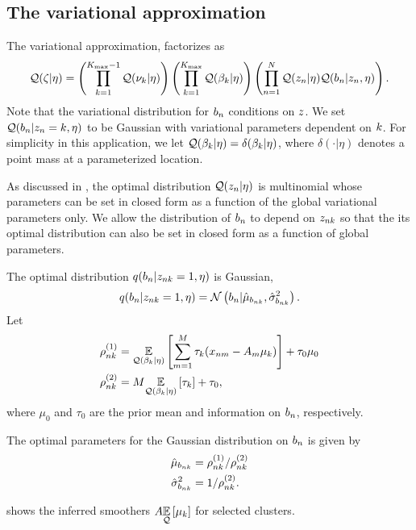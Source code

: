 \subsection{The variational approximation}
The variational approximation, factorizes as
\begin{align*}
\mathcal{Q}(\zeta \vert \eta) =
    \left( \prod_{k=1}^{{K_{\mathrm{max}}} - 1} \mathcal{Q}(\nu_{k} \vert \eta) \right)
    \left( \prod_{k=1}^{{K_{\mathrm{max}}}} \mathcal{Q}(\beta_k \vert \eta) \right)
    \left( \prod_{n=1}^{N} \mathcal{Q}(z_{n} \vert \eta)
    \mathcal{Q}(b_{n} \vert z_{n}, \eta)\right).
\end{align*}
Note that the variational distribution for $b_n$ conditions on $z$.
We set $\mathcal{Q}(b_{n} \vert z_{n} = k, \eta)$ to be Gaussian
with variational parameters dependent on $k$.
For simplicity in this application,
we let $\mathcal{Q}(\beta_k \vert \eta) = \delta (\beta_k \vert \eta)$,
where $\delta(\cdot \vert \eta)$ denotes a point mass at a parameterized location.

As discussed in ,
the optimal distribution $\mathcal{Q}(z_n\vert\eta)$ is multinomial whose parameters
can be set in closed form as a function of the global variational parameters only.
We allow the distribution of $b_n$ to depend on $z_{nk}$ so that
the its optimal distribution can also be set in closed form as a function of
global parameters.

The optimal distribution $q(b_n\vert z_{nk} = 1, \eta)$ is Gaussian,
\begin{align*}
q(b_n\vert z_{nk} = 1, \eta) = \mathcal{N}\left(b_n \vert \hat\mu_{b_{nk}}, \hat\sigma^2_{b_{nk}}\right).
\end{align*}
Let
\begin{align*}
  \rho^{(1)}_{nk} &= \underset{\mathcal{Q}(\beta_k|\eta)}{\mathbb{E}}\left[\sum_{m=1}^M \tau_{k}(x_{nm} - A_m\mu_k)\right] +
  \tau_0 \mu_0 \\
  \rho^{(2)}_{nk} &= M \underset{\mathcal{Q}(\beta_k|\eta)}{\mathbb{E}}\left[\tau_{k}\right] + \tau_0,
\end{align*}
where $\mu_0$ and $\tau_0$ are the prior mean and information on $b_n$, respectively.

The optimal parameters for the Gaussian distribution on $b_n$ is given by
\begin{align*}
  \hat\mu_{b_{nk}} &= \rho^{(1)}_{nk} / \rho^{(2)}_{nk}\\
  \hat\sigma^2_{b_{nk}} &= 1 / \rho^{(2)}_{nk}.
\end{align*}

 shows the inferred smoothers
$A \underset{\mathcal{Q}}{\mathbb{E}}\left[\mu_k\right]$ for selected clusters. 
\MiceSmoothers

